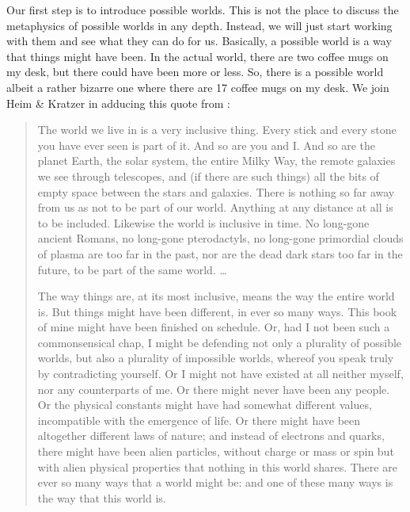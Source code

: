 Our first step is to introduce possible worlds. This is not the place to discuss
the metaphysics of possible worlds in any depth. Instead, we will just start
working with them and see what they can do for us. Basically, a possible world
is a way that things might have been. In the actual world, there are two coffee
mugs on my desk, but there could have been more or less. So, there is a possible
world \dash albeit a rather bizarre one \dash where there are 17 coffee mugs on
my desk. We join Heim \& Kratzer in adducing this quote from
\citet[1f.]{lewis-1986-PluralityWorlds}:

\begin{quote}
  The world we live in is a very inclusive thing. Every stick and every stone
  you have ever seen is part of it. And so are you and I. And so are the planet
  Earth, the solar system, the entire Milky Way, the remote galaxies we see
  through telescopes, and (if there are such things) all the bits of empty space
  between the stars and galaxies. There is nothing so far away from us as not to
  be part of our world. Anything at any distance at all is to be included.
  Likewise the world is inclusive in time. No long-gone ancient Romans, no
  long-gone pterodactyls, no long-gone primordial clouds of plasma are too far
  in the past, nor are the dead dark stars too far in the future, to be part of
  the same world. \dots
	
  The way things are, at its most inclusive, means the way the entire world is.
  But things might have been different, in ever so many ways. This book of mine
  might have been finished on schedule. Or, had I not been such a commonsensical
  chap, I might be defending not only a plurality of possible worlds, but also a
  plurality of impossible worlds, whereof you speak truly by contradicting
  yourself. Or I might not have existed at all \dash neither myself, nor any
  counterparts of me. Or there might never have been any people. Or the physical
  constants might have had somewhat different values, incompatible with the
  emergence of life. Or there might have been altogether different laws of
  nature; and instead of electrons and quarks, there might have been alien
  particles, without charge or mass or spin but with alien physical properties
  that nothing in this world shares. There are ever so many ways that a world
  might be: and one of these many ways is the way that this world is.
\end{quote}%
%
\clearpage
{}%
